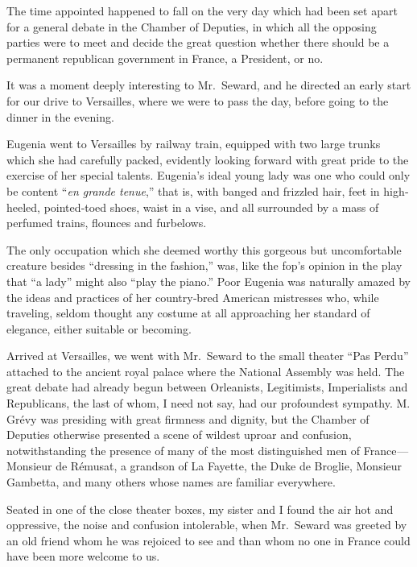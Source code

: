 \documentclass[12pt]{book}
\begin{document}
The time appointed happened to fall on the very day which had been set apart
for a general debate in the Chamber of Deputies, in which all the opposing parties
were to meet and decide the great question whether there should be a permanent
republican government in France, a President, or no.

It was a moment deeply interesting to Mr.~Seward, and he directed an early
start for our drive to Versailles, where we were to pass the day, before going to
the dinner in the evening.

Eugenia went to Versailles by railway train, equipped with two large trunks
which she had carefully packed, evidently looking forward with great pride to
the exercise of her special talents. Eugenia’s ideal young lady was one who could
only be content “{\it en grande tenue},” that is, with banged and frizzled hair, feet in
high‐heeled, pointed‐toed shoes, waist in a vise, and all surrounded by a mass of
perfumed trains, flounces and furbelows.

The only occupation which she deemed worthy this gorgeous but uncomfortable creature besides “dressing in the fashion,” was, like the fop’s opinion in
the play that “a lady” might also “play the piano.” Poor Eugenia was naturally
amazed by the ideas and practices of her country‐bred American mistresses who,
while traveling, seldom thought any costume at all approaching her standard of
elegance, either suitable or becoming.

Arrived at Versailles, we went with Mr.~Seward to the small theater “Pas Perdu”
attached to the ancient royal palace where the National Assembly was held. The
great debate had already begun between Orleanists, Legitimists, Imperialists and
Republicans, the last of whom, I need not say, had our profoundest sympathy. M.
Grévy was presiding with great firmness and dignity, but the Chamber of Deputies
otherwise presented a scene of wildest uproar and confusion, notwithstanding
the presence of many of the most distinguished men of France — Monsieur de
Rémusat, a grandson of La Fayette, the Duke de Broglie, Monsieur Gambetta, and
many others whose names are familiar everywhere.

Seated in one of the close theater boxes, my sister and I found the air hot and
oppressive, the noise and confusion intolerable, when Mr.~Seward was greeted
by an old friend whom he was rejoiced to see and than whom no one in France
could have been more welcome to us.
\end{document}
